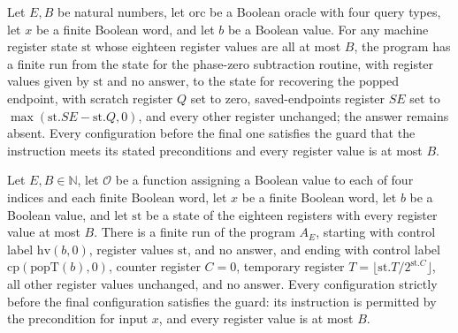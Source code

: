 \begin{theorem}
\label{Complexity.LogProg.SavitchARM.sb_run}
\leanok
{}
Let $E,B$ be natural numbers, let $\mathrm{orc}$ be a Boolean oracle with four query
types, let $x$ be a finite Boolean word, and let $b$ be a Boolean value. For any machine
register state $\mathrm{st}$ whose eighteen register values are all at most $B$, the
program has a finite run from the state for the phase-zero subtraction routine, with
register values given by $\mathrm{st}$ and no answer, to the state for recovering the
popped endpoint, with scratch register $Q$ set to zero, saved-endpoints register $SE$
set to $\max(\mathrm{st}.SE-\mathrm{st}.Q,0)$, and every other register unchanged; the
answer remains absent. Every configuration before the final one satisfies the guard that
the instruction meets its stated preconditions and every register value is at most $B$.
\end{theorem}

\begin{theorem}
\label{Complexity.LogProg.SavitchARM.hv_run}
\leanok
{}
Let $E,B\in\mathbb{N}$, let $\mathcal{O}$ be a function assigning a Boolean value to
each of four indices and each finite Boolean word, let $x$ be a finite Boolean word, let
$b$ be a Boolean value, and let $\mathrm{st}$ be a state of the eighteen registers with
every register value at most $B$. There is a finite run of the program $A_E$, starting
with control label $\mathrm{hv}(b,0)$, register values $\mathrm{st}$, and no answer, and
ending with control label $\mathrm{cp}(\mathrm{popT}(b),0)$, counter register $C=0$,
temporary register $T=\lfloor \mathrm{st}.T/2^{\mathrm{st}.C}\rfloor$, all other
register values unchanged, and no answer. Every configuration strictly before the final
configuration satisfies the guard: its instruction is permitted by the precondition for
input $x$, and every register value is at most $B$.
\end{theorem}

